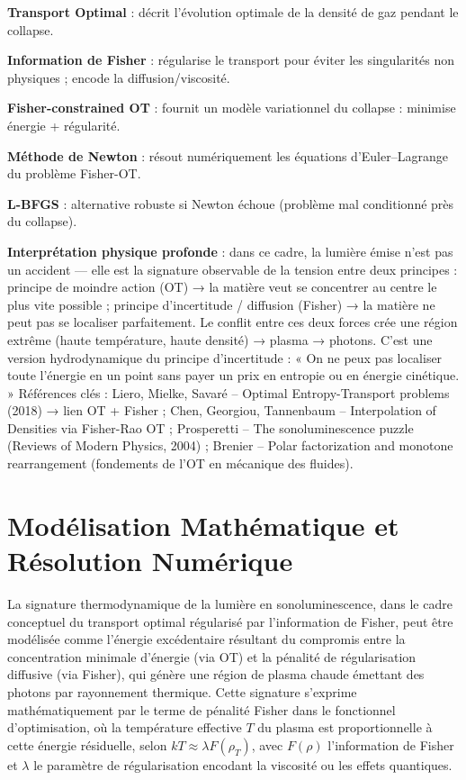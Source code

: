 \documentclass[a4paper,12pt]{article}
\begin{document}
\item \textbf{Transport Optimal} : décrit l’évolution optimale de la densité de gaz pendant le collapse.
    \item \textbf{Information de Fisher} : régularise le transport pour éviter les singularités non physiques ; encode la diffusion/viscosité.
    \item \textbf{Fisher-constrained OT} : fournit un modèle variationnel du collapse : minimise énergie + régularité.
    \item \textbf{Méthode de Newton} : résout numériquement les équations d’Euler–Lagrange du problème Fisher-OT.
    \item \textbf{L-BFGS} : alternative robuste si Newton échoue (problème mal conditionné près du collapse).
    \item \textbf{Interprétation physique profonde} : dans ce cadre, la lumière émise n’est pas un accident — elle est la signature observable de la tension entre deux principes : principe de moindre action (OT) → la matière veut se concentrer au centre le plus vite possible ; principe d’incertitude / diffusion (Fisher) → la matière ne peut pas se localiser parfaitement. Le conflit entre ces deux forces crée une région extrême (haute température, haute densité) → plasma → photons. C’est une version hydrodynamique du principe d’incertitude : « On ne peux pas localiser toute l’énergie en un point sans payer un prix en entropie ou en énergie cinétique. »
Références clés : Liero, Mielke, Savaré – Optimal Entropy-Transport problems (2018) → lien OT + Fisher ; Chen, Georgiou, Tannenbaum – Interpolation of Densities via Fisher-Rao OT ; Prosperetti – The sonoluminescence puzzle (Reviews of Modern Physics, 2004) ; Brenier – Polar factorization and monotone rearrangement (fondements de l’OT en mécanique des fluides). 
\newpage
\section{Modélisation Mathématique et Résolution Numérique}
La signature thermodynamique de la lumière en sonoluminescence, dans le cadre conceptuel du transport optimal régularisé par l'information de Fisher, peut être modélisée comme l'énergie excédentaire résultant du compromis entre la concentration minimale d'énergie (via OT) et la pénalité de régularisation diffusive (via Fisher), qui génère une région de plasma chaude émettant des photons par rayonnement thermique. Cette signature s'exprime mathématiquement par le terme de pénalité Fisher dans le fonctionnel d'optimisation, où la température effective \( T \) du plasma est proportionnelle à cette énergie résiduelle, selon \( k T \approx \lambda F(\rho_T) \), avec \( F(\rho) \) l'information de Fisher et \( \lambda \) le paramètre de régularisation encodant la viscosité ou les effets quantiques.
\end{document}
